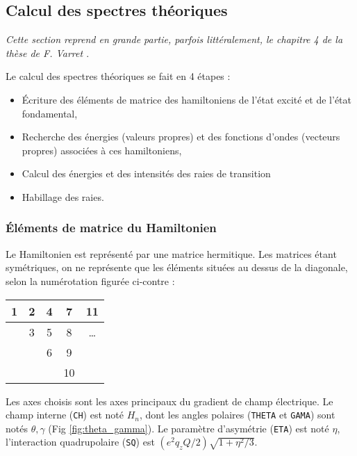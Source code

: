 \newpage
\subsection{Calcul des spectres théoriques}
{\it Cette section reprend en grande partie, parfois littéralement, le chapitre 4 de la thèse de F. Varret \cite{varret-these}}.

Le calcul des spectres théoriques se fait en 4 étapes :

\begin{itemize}
\item \'Ecriture des éléments de matrice des hamiltoniens de l'état excité et de l'état fondamental,
\item Recherche des énergies (valeurs propres) et des fonctions d'ondes (vecteurs propres) associées à ces hamiltoniens,
\item Calcul des énergies et des intensités des raies de transition
\item Habillage des raies.
\end{itemize}

\subsubsection{\'Eléments de matrice du Hamiltonien}
\begin{multicols}{2}
Le Hamiltonien est représenté par une matrice hermitique.
Les matrices étant symétriques, on ne représente que les éléments situées au dessus de la diagonale, 
selon la numérotation figurée ci-contre :

\columnbreak

\begin{tabular}{|c|c|c|c|c|}
  \hline
    1 & 2 & 4 & 7 & 11\\
  \hline
      & 3 & 5 & 8 & \dots\\
  \hline
      &   & 6 & 9 & \\
  \hline
      &   &   & 10 &\\
  \hline
\end{tabular}
\end{multicols}

Les axes choisis sont les axes principaux du gradient de champ électrique. 
Le champ interne (\lstinline{CH}) est noté $H_n$, dont les angles polaires (\lstinline{THETA} et \lstinline{GAMA})  sont notés $\theta,\gamma$ (Fig \ref{fig:theta_gamma}).
Le paramètre d'asymétrie (\lstinline{ETA}) est noté $\eta$, l'interaction quadrupolaire (\lstinline{SQ}) est $(e^2 q_z Q/2)\sqrt{1+\eta^2 /3}$.



